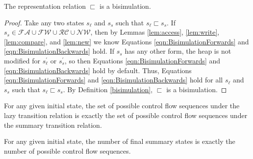 %
%
%
%

\begin{theorem}
The representation relation $\sqsubset$ is a bisimulation.
\end{theorem}

\begin{proof}
Take any two states $s_\ell$ and $s_s$ such that $s_\ell \sqsubset s_s$. If $s_s \in \mathcal{FA} \cup \mathcal{FW} \cup \mathcal{RC} \cup \mathcal{NW}$, then by Lemmas \ref{lem:access}, \ref{lem:write}, \ref{lem:compare}, and \ref{lem:new} we know Equations \ref{eqn:BisimulationForwards} and \ref{eqn:BisimulationBackwards} hold. If $s_s$ has any other form, the heap is not modified for $s_\ell^\prime$ or $s_s^\prime$, so then Equations \ref{eqn:BisimulationForwards} and \ref{eqn:BisimulationBackwards} hold by default. Thus, Equations \ref{eqn:BisimulationForwards} and \ref{eqn:BisimulationBackwards} hold for all  $s_\ell$ and $s_s$ such that $s_\ell \sqsubset s_s$. By Definition \ref{bisimulation}, $\sqsubset$ is a bisimulation.

\end{proof}

\begin{corollary}
For any given initial state, the set of possible control flow sequences under the lazy transition relation is exactly the set of possible control flow sequences under the summary transition relation.
\end{corollary}

\begin{corollary}
For any given initial state, the number of final summary states is exactly the number of possible control flow sequences.
\end{corollary}



